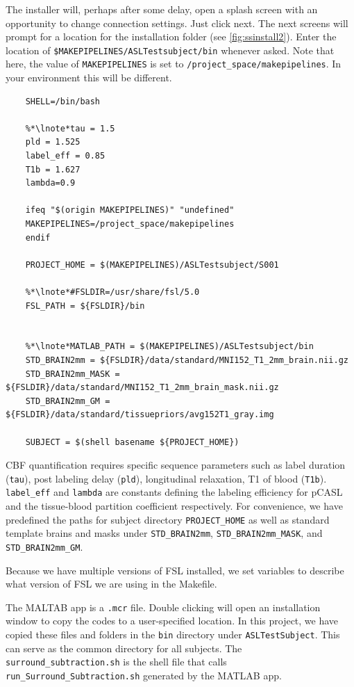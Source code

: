 The installer will, perhaps after some delay, open a splash screen
with an opportunity to change connection settings. Just click next.
The next screens will prompt for a location for the installation folder
(see \autoref{fig:ssinstall2}). Enter the location of
\texttt{\$MAKEPIPELINES/ASLTestsubject/bin} whenever asked. Note that
here, the value of \texttt{MAKEPIPELINES} is set to
\texttt{/project_space/makepipelines}. In your environment this will
be different.
\clearpage

\begin{lstlisting}
	SHELL=/bin/bash

	%*\lnote*tau = 1.5
	pld = 1.525
	label_eff = 0.85
	T1b = 1.627
	lambda=0.9

	ifeq "$(origin MAKEPIPELINES)" "undefined"
	MAKEPIPELINES=/project_space/makepipelines
	endif

	PROJECT_HOME = $(MAKEPIPELINES)/ASLTestsubject/S001

	%*\lnote*#FSLDIR=/usr/share/fsl/5.0
	FSL_PATH = ${FSLDIR}/bin


	%*\lnote*MATLAB_PATH = $(MAKEPIPELINES)/ASLTestsubject/bin
	STD_BRAIN2mm = ${FSLDIR}/data/standard/MNI152_T1_2mm_brain.nii.gz
	STD_BRAIN2mm_MASK = ${FSLDIR}/data/standard/MNI152_T1_2mm_brain_mask.nii.gz
	STD_BRAIN2mm_GM = ${FSLDIR}/data/standard/tissuepriors/avg152T1_gray.img

	SUBJECT = $(shell basename ${PROJECT_HOME})	
\end{lstlisting}

CBF quantification requires specific sequence parameters such as label duration (\texttt{tau}), post labeling delay (\texttt{pld}), longitudinal relaxation, T1 of blood (\texttt{T1b}). \texttt{label_eff} and \texttt{lambda} are constants defining the labeling efficiency for pCASL and the tissue-blood partition coefficient respectively. For convenience, we have predefined the paths for subject directory \texttt{PROJECT_HOME} as well as standard template brains and masks under \texttt{STD_BRAIN2mm}, \texttt{STD_BRAIN2mm_MASK}, and \texttt{STD_BRAIN2mm_GM}. 

Because we have multiple versions of FSL installed, we set variables to describe what version of FSL we are using in the Makefile. 

 The MALTAB app is a \texttt{.mcr} file. Double clicking will open an installation window to copy the codes to a user-specified location. In this project, we have copied these files and folders in the \texttt{bin} directory under \texttt{ASLTestSubject}. This can serve as the common directory for all subjects. The \texttt{surround_subtraction.sh} is the shell file that calls \texttt{run_Surround_Subtraction.sh} generated by the MATLAB app. 
 
